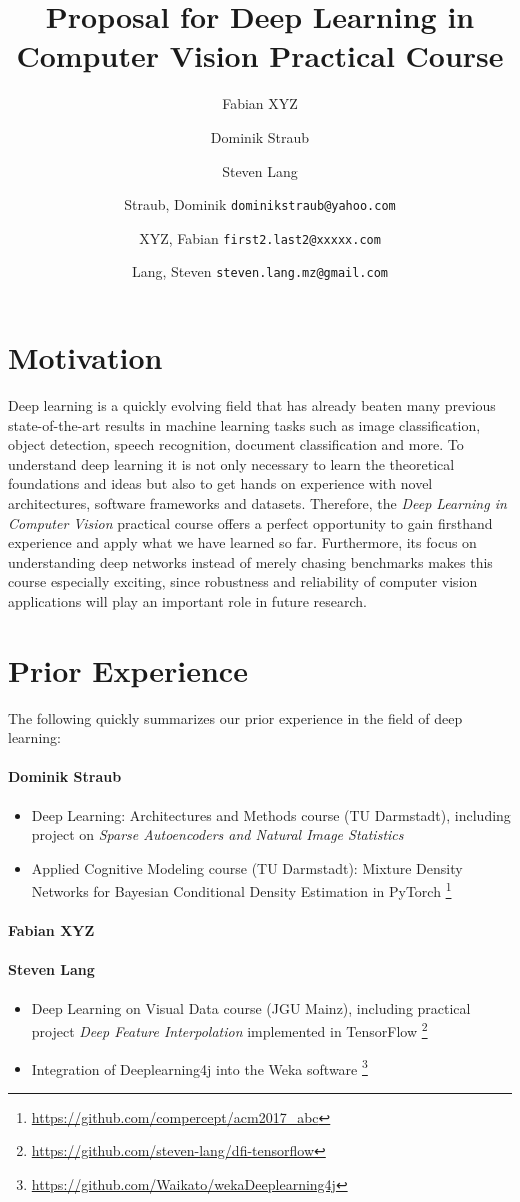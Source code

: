 \documentclass[11pt,english]{article}
\title{Proposal for Deep Learning in Computer Vision Practical Course}
\author{Fabian XYZ}
\author{Dominik Straub}
\author{Steven Lang}
\author{
	Straub, Dominik \texttt{dominikstraub@yahoo.com}
	\and
	XYZ, Fabian \texttt{first2.last2@xxxxx.com}
	\and
	Lang, Steven \texttt{steven.lang.mz@gmail.com}\\
}
\begin{document}
\maketitle
\section{Motivation}
Deep learning is a quickly evolving field that has already beaten many previous state-of-the-art results in machine learning tasks such as image classification, object detection, speech recognition, document classification and more. To understand deep learning it is not only necessary to learn the theoretical foundations and ideas but also to get hands on experience with novel architectures, software frameworks and datasets. Therefore, the \textit{Deep Learning in Computer Vision} practical course offers a perfect opportunity to gain firsthand experience and apply what we have learned so far. Furthermore, its focus on understanding deep networks instead of merely chasing benchmarks makes this course especially exciting, since robustness and reliability of computer vision applications will play an important role in future research.

\section{Prior Experience}
The following quickly summarizes our prior experience in the field of deep learning:

\paragraph{Dominik Straub}
\begin{itemize}
    \setlength\itemsep{-0.25em}
    \item Deep Learning: Architectures and Methods course (TU Darmstadt), including project on \textit{Sparse Autoencoders and Natural Image Statistics}
    \item Applied Cognitive Modeling course (TU Darmstadt): Mixture Density Networks for Bayesian Conditional Density Estimation in PyTorch \footnote{\url{https://github.com/compercept/acm2017_abc}}
\end{itemize}
\paragraph{Fabian XYZ}
\paragraph{Steven Lang}
\begin{itemize}
	\setlength\itemsep{-0.25em}
	\item Deep Learning on Visual Data course (JGU Mainz), including practical project \textit{Deep Feature Interpolation} \cite{DBLP:journals/corr/UpchurchGBPSW16} implemented in TensorFlow \footnote{\url{https://github.com/steven-lang/dfi-tensorflow}}
	\item Integration of Deeplearning4j into the Weka software \footnote{\url{https://github.com/Waikato/wekaDeeplearning4j}}
\end{itemize}
\end{document}
